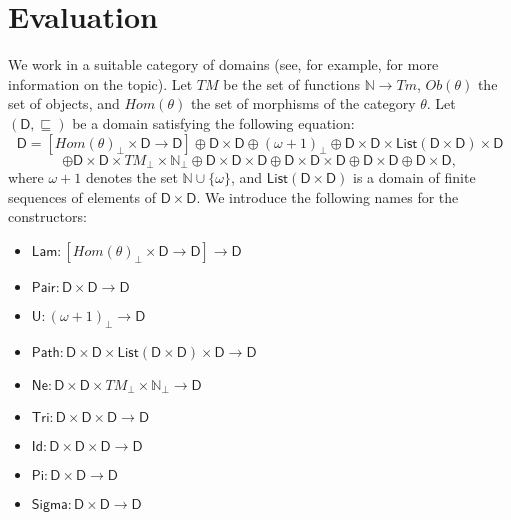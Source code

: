 \documentclass{amsart}
\theoremstyle{definition}
\theoremstyle{remark}
\newcommand{\D}{\mathsf{D}}
\newcommand{\nats}{\mathbb{N}}
\numberwithin{table}{section}
\begin{document}
\section{Evaluation}
\label{sec:eval}

We work in a suitable category of domains (see, for example, \cite{domains} for more information on the topic).
Let $TM$ be the set of functions $\nats \to Tm$, $Ob(\theta)$ the set of objects, and $Hom(\theta)$ the set of morphisms of the category $\theta$.
Let $(\D,\sqsubseteq)$ be a domain satisfying the following equation:
\[ \D = [Hom(\theta)_\bot \times \D \to \D] \oplus \D \times \D \oplus (\omega + 1)_\bot \oplus \D \times \D \times \mathsf{List}(\D \times \D) \times \D \]
\[ \oplus \D \times \D \times TM_\bot \times \nats_\bot \oplus \D \times \D \times \D \oplus \D \times \D \times \D \oplus \D \times \D \oplus \D \times \D, \]
where $\omega + 1$ denotes the set $\nats \cup \{ \omega \}$, and $\mathsf{List}(\D \times \D)$ is a domain of finite sequences of elements of $\D \times \D$.
We introduce the following names for the constructors:
\begin{itemize}
\item[] $\mathsf{Lam} : [Hom(\theta)_\bot \times \D \to \D] \to \D$
\item[] $\mathsf{Pair} : \D \times \D \to \D$
\item[] $\mathsf{U} : (\omega + 1)_\bot \to \D$
\item[] $\mathsf{Path} : \D \times \D \times \mathsf{List}(\D \times \D) \times \D \to \D$
\item[] $\mathsf{Ne} : \D \times \D \times TM_\bot \times \nats_\bot \to \D$
\item[] $\mathsf{Tri} : \D \times \D \times \D \to \D$
\item[] $\mathsf{Id} : \D \times \D \times \D \to \D$
\item[] $\mathsf{Pi} : \D \times \D \to \D$
\item[] $\mathsf{Sigma} : \D \times \D \to \D$
\end{itemize}
\end{document}
